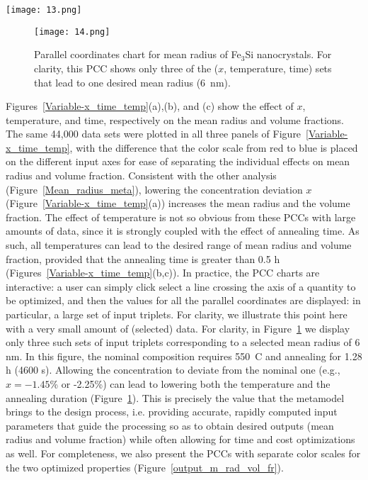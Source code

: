 \begin{figure*}[ht]
\centering
\texttt{[image: 13.png]}
\caption{Parallel coordinates chart for input variables (a) $x$, (b) temperature, and (c) time from 44,000 sets of data.\cite{CITRINE}}  \label{Variable-x_time_temp}
\end{figure*}


\begin{figure}[ht]
\centering
\texttt{[image: 14.png]}
\caption{Parallel coordinates chart for mean radius  of Fe$_3$Si nanocrystals. For clarity, this PCC shows
only three of the ($x$, temperature, time) sets that lead to one desired mean radius (6~nm).\cite{CITRINE}}  \label{onemeanrad}
\end{figure}



Figures~\ref{Variable-x_time_temp}(a),(b), and (c) show the effect of $x$, temperature, and time, respectively on the mean radius and volume fractions.
The same 44,000  data sets \cite{CITRINE} were plotted in all three panels of Figure~\ref{Variable-x_time_temp}, with the difference that the color scale from red to blue is placed on
the different input axes for ease of separating the individual effects on mean radius and volume fraction. Consistent with the
other analysis (Figure~\ref{Mean_radius_meta}), lowering the concentration deviation $x$  (Figure~\ref{Variable-x_time_temp}(a)) increases the mean radius and the volume fraction. The effect of temperature is not so obvious from these PCCs with large amounts of data, since it is strongly coupled with the effect of annealing time.
As such, all temperatures can lead to the desired range of mean radius and volume fraction, provided that the annealing time is greater than 0.5 h (Figures~\ref{Variable-x_time_temp}(b,c)). In practice, the PCC charts are interactive: a user can simply click select a line crossing the axis
of a quantity to be optimized, and then the values for all the parallel coordinates are displayed: in particular, a large set of input triplets.
For clarity, we illustrate this point here with a very small amount of (selected) data. For clarity, in
Figure~\ref{onemeanrad} we display only three such sets of input triplets corresponding to a selected mean radius of 6 nm.
In this figure,  the nominal composition requires 550~\degree C and annealing for 1.28 h (4600 s).
Allowing the concentration to deviate from the nominal one (e.g., $x=-1.45$\% or -2.25\%) can lead to
lowering both the temperature and the annealing duration (Figure~\ref{onemeanrad}).
This is precisely the value that the metamodel brings to the design process, i.e. providing
accurate, rapidly computed input parameters that guide the
processing so as to obtain desired outputs (mean radius and volume fraction) while
often allowing for time and cost optimizations as well.
For completeness, we also present the PCCs with separate color scales for the two optimized properties (Figure~\ref{output_m_rad_vol_fr}).




